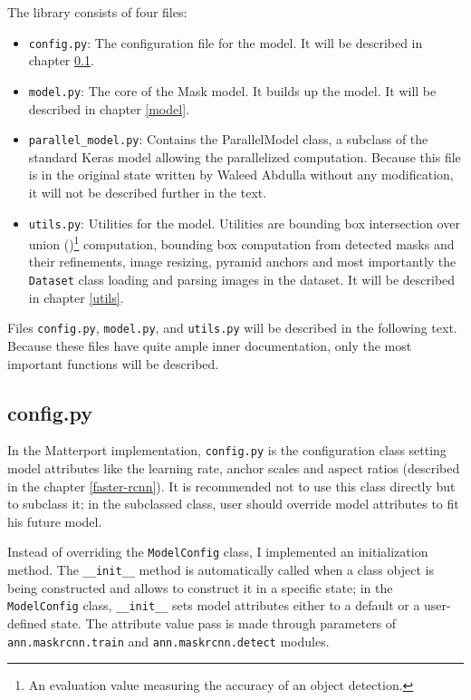 The library consists of four files:
\begin{itemize}
	 \item \verb|config.py|: The configuration file for the model. It will be described in chapter \ref{config}.
	 \item \verb|model.py|: The core of the Mask  model. It builds up the model. It will be described in chapter \ref{model}.
	 \item \verb|parallel_model.py|: Contains the ParallelModel class, a subclass of the standard Keras model allowing the parallelized computation. Because this file is in the original state written by Waleed Abdulla without any modification, it will not be described further in the text.
	 \item \verb|utils.py|: Utilities for the model. Utilities are bounding box intersection over union ()\footnote{An evaluation value measuring the accuracy of an object detection.} computation, bounding box computation from detected masks and their refinements, image resizing, pyramid anchors and most importantly the \verb|Dataset| class loading and parsing images in the dataset. It will be described in chapter \ref{utils}.
\end{itemize}

Files \verb|config.py|, \verb|model.py|, and \verb|utils.py| will be described in the following text. Because these files have quite ample inner documentation, only the most important functions will be described.

\subsection{config.py}
\label{config}

In the Matterport implementation, \verb|config.py| is the configuration class setting model attributes like the learning rate,  anchor scales and aspect ratios (described in the chapter \ref{faster-rcnn}). It is recommended not to use this class directly but to subclass it; in the subclassed class, user should override model attributes to fit his future model.

Instead of overriding the \verb|ModelConfig| class, I implemented an initialization method. The \verb|__init__| method is automatically called when a class object is being constructed and allows to construct it in a specific state; in the \verb|ModelConfig| class, \verb|__init__| sets model attributes either to a default or a user-defined state. The attribute value pass is made through parameters of \verb|ann.maskrcnn.train| and \verb|ann.maskrcnn.detect| modules.

